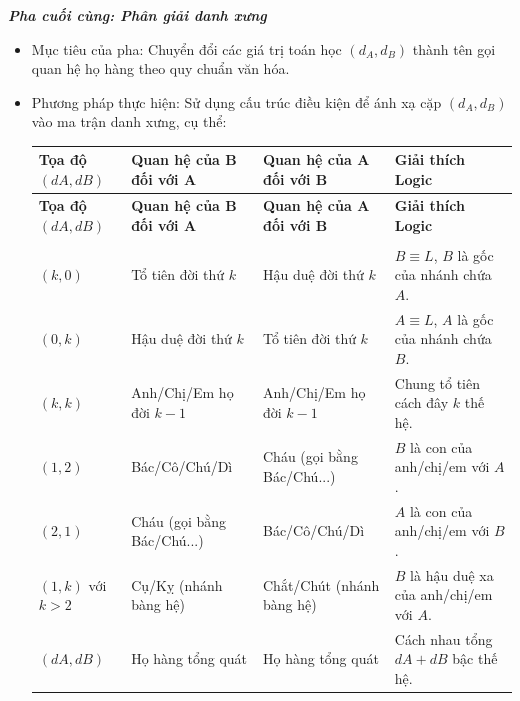 \textbf{\textit{Pha cuối cùng: Phân giải danh xưng}}
\begin{itemize}
	\item Mục tiêu của pha: Chuyển đổi các giá trị toán học $(d_A, d_B)$ thành tên gọi quan hệ họ hàng theo quy chuẩn văn hóa.
	\item Phương pháp thực hiện: Sử dụng cấu trúc điều kiện để ánh xạ cặp $(d_A, d_B)$ vào ma trận danh xưng, cụ thể:
	
	\begin{center}
		\small
		\setlength{\tabcolsep}{4pt}
		\renewcommand{\arraystretch}{1.2}
		\begin{longtable}{
				|>{\centering\arraybackslash}m{2.2cm}|
				>{\centering\arraybackslash}m{3.2cm}|
				>{\centering\arraybackslash}m{3.2cm}|
				>{\arraybackslash}m{6.2cm}|
			}
			\hline
			\textbf{Tọa độ} $(dA,dB)$ & 
			\textbf{Quan hệ của B đối với A} & 
			\textbf{Quan hệ của A đối với B} & 
			\textbf{Giải thích Logic} \\ 
			\hline
			\endfirsthead
			
			\hline
			\textbf{Tọa độ} $(dA,dB)$ & 
			\textbf{Quan hệ của B đối với A} & 
			\textbf{Quan hệ của A đối với B} & 
			\textbf{Giải thích Logic} \\ 
			\hline
			\endhead
			
			\hline
			\multicolumn{4}{r}{\textit{Còn tiếp}} \\
			\endfoot
			
			\hline
			\endlastfoot
			
			$(k,0)$      & Tổ tiên đời thứ $k$                & Hậu duệ đời thứ $k$                & $B \equiv L$, $B$ là gốc của nhánh chứa $A$. \\ \hline
			$(0,k)$      & Hậu duệ đời thứ $k$                & Tổ tiên đời thứ $k$                & $A \equiv L$, $A$ là gốc của nhánh chứa $B$. \\ \hline
			$(k,k)$      & Anh/Chị/Em họ đời $k-1$           & Anh/Chị/Em họ đời $k-1$           & Chung tổ tiên cách đây $k$ thế hệ. \\ \hline
			$(1,2)$      & Bác/Cô/Chú/Dì                      & Cháu (gọi bằng Bác/Chú...)         & $B$ là con của anh/chị/em với $A$. \\ \hline
			$(2,1)$      & Cháu (gọi bằng Bác/Chú...)         & Bác/Cô/Chú/Dì                      & $A$ là con của anh/chị/em với $B$. \\ \hline
			$(1,k)$ với $k>2$ & Cụ/Kỵ (nhánh bàng hệ)          & Chắt/Chút (nhánh bàng hệ)          & $B$ là hậu duệ xa của anh/chị/em với $A$. \\ \hline
			$(dA,dB)$    & Họ hàng tổng quát                  & Họ hàng tổng quát                  & Cách nhau tổng $dA+dB$ bậc thế hệ. \\ \hline
			
		\end{longtable}
	\end{center}
\end{itemize}

